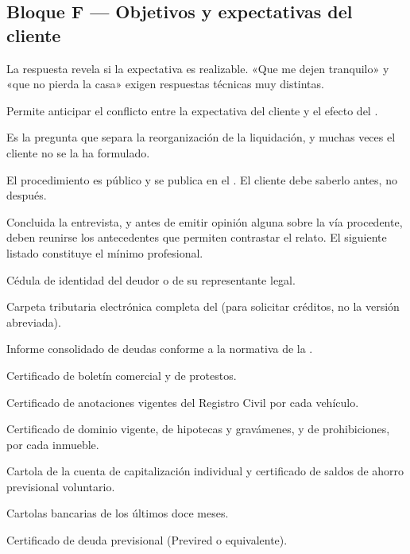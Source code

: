 \subsection{Bloque F — Objetivos y expectativas del cliente}

\begin{cuestionario}
  {La respuesta revela si la expectativa es realizable. «Que me dejen tranquilo» y
  «que no pierda la casa» exigen respuestas técnicas muy distintas.}

  {Permite anticipar el conflicto entre la expectativa del cliente y el efecto del
  \desasimiento{}.}

  {Es la pregunta que separa la reorganización de la liquidación, y muchas veces el
  cliente no se la ha formulado.}

  {El procedimiento es público y se publica en el \boletin{}. El cliente debe saberlo
  antes, no después.}
\end{cuestionario}

\bloqueDocumental

Concluida la entrevista, y antes de emitir opinión alguna sobre la vía procedente, deben
reunirse los antecedentes que permiten contrastar el relato. El siguiente listado
constituye el mínimo profesional.

\begin{checklist}
  \item Cédula de identidad del deudor o de su representante legal.
  \item Carpeta tributaria electrónica completa del \sii{} (para solicitar créditos, no
  la versión abreviada).
  \item Informe consolidado de deudas conforme a la normativa de la
  \cmf{}.
  \item Certificado de boletín comercial y de protestos.
  \item Certificado de anotaciones vigentes del Registro Civil por cada vehículo.
  \item Certificado de dominio vigente, de hipotecas y gravámenes, y de prohibiciones,
  por cada inmueble.
  \item Cartola de la cuenta de capitalización individual y certificado de saldos de
  ahorro previsional voluntario.
  \item Cartolas bancarias de los últimos doce meses.
  \item Certificado de deuda previsional (Previred o equivalente).
\end{checklist}

